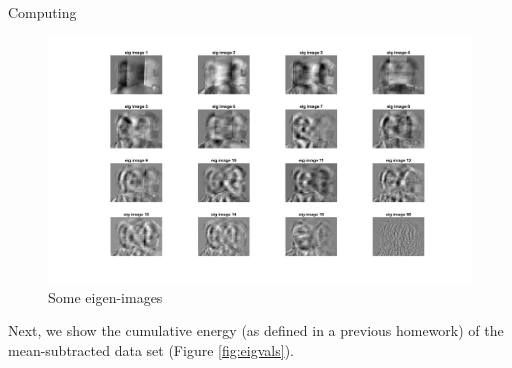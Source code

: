 \begin{section}{Computing}
{    \begin{minipage}{1.0\textwidth}
        \begin{figure}[H]
        \centering
        \includegraphics[trim={0cm 0cm 0cm 2cm},clip,width=0.85\columnwidth]{../data/eig_images}
        \setlength{\abovecaptionskip}{-20pt}
        \caption{Some eigen-images}
        \label{fig:eig_images}
        \end{figure}
    \end{minipage}
    Next, we show the cumulative energy (as defined in a previous homework) of the mean-subtracted data set (Figure \ref{fig:eigvals}). 
}

\end{section}

